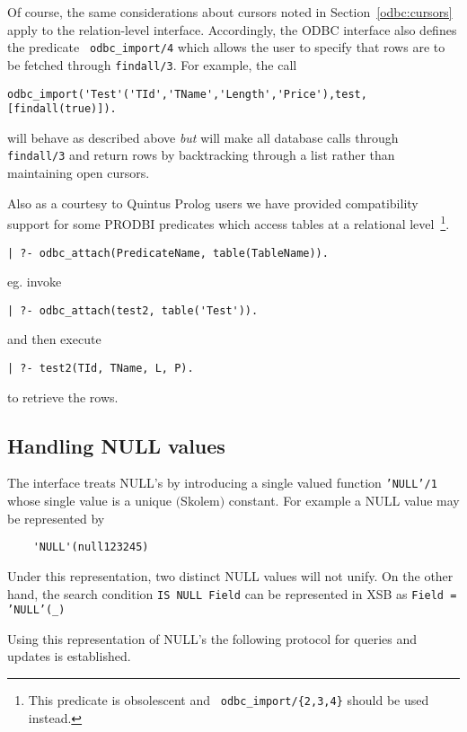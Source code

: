 Of course, the same considerations about cursors noted in
Section~\ref{odbc:cursors} apply to the relation-level interface.
Accordingly, the ODBC interface also defines the predicate {\tt
odbc\_import/4} which allows the user to specify that rows are to be
fetched through {\tt findall/3}.  For example, the call 
%
\begin{verbatim}
odbc_import('Test'('TId','TName','Length','Price'),test,[findall(true)]).
\end{verbatim}
will behave as described above {\em but} will make all database calls
through {\tt findall/3} and return rows by backtracking through a list
rather than maintaining open cursors.


Also as a courtesy to Quintus Prolog users we have provided
compatibility support for some PRODBI predicates which access tables
at a relational level~\footnote{This predicate is obsolescent and {\tt
odbc\_import/\{2,3,4\}} should be used instead.}.

\begin{verbatim}
| ?- odbc_attach(PredicateName, table(TableName)).
\end{verbatim}

eg. invoke 
\begin{verbatim}
| ?- odbc_attach(test2, table('Test')).
\end{verbatim}
and then execute 
\begin{verbatim}
| ?- test2(TId, TName, L, P).
\end{verbatim}
to retrieve the rows.


\subsection{Handling NULL values}\label{NULL-values}

The interface treats NULL's by introducing a single valued function
{\tt 'NULL'/1} whose single value is a unique $($Skolem$)$ constant.
For example a NULL value may be represented by 
\begin{verbatim}
	'NULL'(null123245) 
\end{verbatim} 
Under this representation, two distinct NULL values will not unify.
On the other hand, the search condition {\tt IS NULL Field} can be
represented in XSB as {\tt Field = 'NULL'(\_)}

Using this representation of NULL's the following protocol for queries
and updates is established.

